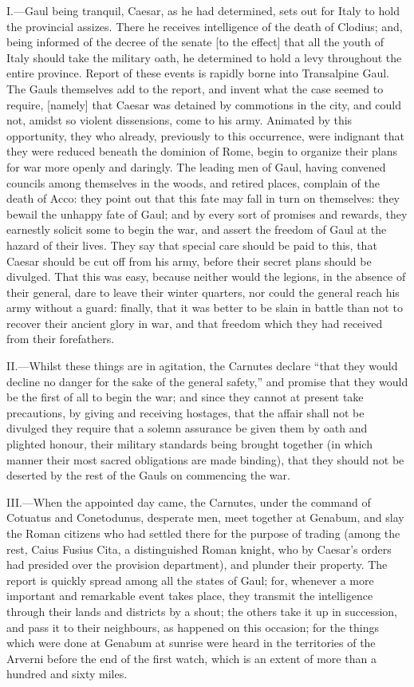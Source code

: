 
I.—Gaul being tranquil, Caesar, as he had determined, sets out for
Italy to hold the provincial assizes. There he receives intelligence of
the death of Clodius; and, being informed of the decree of the senate
[to the effect] that all the youth of Italy should take the military
oath, he determined to hold a levy throughout the entire province.
Report of these events is rapidly borne into Transalpine Gaul. The Gauls
themselves add to the report, and invent what the case seemed to
require, [namely] that Caesar was detained by commotions in the city,
and could not, amidst so violent dissensions, come to his army. Animated
by this opportunity, they who already, previously to this occurrence,
were indignant that they were reduced beneath the dominion of Rome,
begin to organize their plans for war more openly and daringly. The
leading men of Gaul, having convened councils among themselves in the
woods, and retired places, complain of the death of Acco: they point out
that this fate may fall in turn on themselves: they bewail the unhappy
fate of Gaul; and by every sort of promises and rewards, they earnestly
solicit some to begin the war, and assert the freedom of Gaul at the
hazard of their lives. They say that special care should be paid to
this, that Caesar should be cut off from his army, before their secret
plans should be divulged. That this was easy, because neither would the
legions, in the absence of their general, dare to leave their winter
quarters, nor could the general reach his army without a guard: finally,
that it was better to be slain in battle than not to recover their
ancient glory in war, and that freedom which they had received from
their forefathers.

II.—Whilst these things are in agitation, the Carnutes declare ``that
they would decline no danger for the sake of the general safety,'' and
promise that they would be the first of all to begin the war; and since
they cannot at present take precautions, by giving and receiving
hostages, that the affair shall not be divulged they require that a
solemn assurance be given them by oath and plighted honour, their
military standards being brought together (in which manner their most
sacred obligations are made binding), that they should not be deserted
by the rest of the Gauls on commencing the war.

III.—When the appointed day came, the Carnutes, under the command of
Cotuatus and Conetodunus, desperate men, meet together at Genabum, and
slay the Roman citizens who had settled there for the purpose of trading
(among the rest, Caius Fusius Cita, a distinguished Roman knight, who by
Caesar's orders had presided over the provision department), and plunder
their property. The report is quickly spread among all the states of
Gaul; for, whenever a more important and remarkable event takes place,
they transmit the intelligence through their lands and districts by a
shout; the others take it up in succession, and pass it to their
neighbours, as happened on this occasion; for the things which were done
at Genabum at sunrise were heard in the territories of the Arverni
before the end of the first watch, which is an extent of more than a
hundred and sixty miles.

